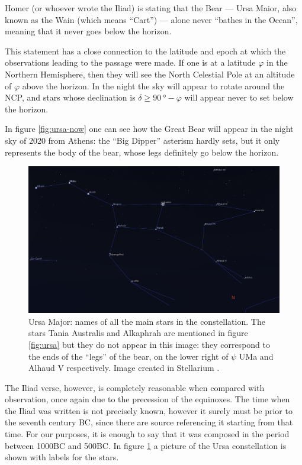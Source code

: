 \documentclass[main.tex]{subfiles}
\begin{document}
Homer (or whoever wrote the Iliad) is stating that the Bear --- Ursa Maior, also known as the Wain (which means ``Cart'') --- alone never ``bathes in the Ocean'', meaning that it never goes below the horizon. 

This statement has a close connection to the latitude and epoch at which the observations leading to the passage were made. 
If one is at a latitude \(\varphi \) in the Northern Hemisphere, then they will see the North Celestial Pole at an altitude of \(\varphi \) above the horizon. In the night the sky will appear to rotate around the NCP, and stars whose declination is \(\delta \geq \SI{90}{\degree} - \varphi \) will appear never to set below the horizon. 

In figure \ref{fig:ursa-now} one can see how the Great Bear will appear in the night sky of 2020 from Athens: the ``Big Dipper'' asterism hardly sets, but it only represents the body of the bear, whose legs definitely go below the horizon. 

\begin{figure}[ht]
\centering
\includegraphics[width=\textwidth]{figures/ursa_names.png}
\caption{Ursa Major: names of all the main stars in the constellation. The stars Tania Australis and Alkaphrah are mentioned in figure \ref{fig:ursa} but they do not appear in this image: they correspond to the ends of the ``legs'' of the bear, on the lower right of \(\psi \) UMa and Alhaud V respectively. Image created in Stellarium \cite[]{stellariumcontributorsStellariumAstronomySoftware2020}.}
\label{fig:ursa-names}
\end{figure}

The Iliad verse, however, is completely reasonable when compared with observation, once again due to the precession of the equinoxes. 
The time when the Iliad was written is not precisely known, however it surely must be prior to the seventh century BC, since there are source referencing it starting from that time.
For our purposes, it is enough to say that it was composed in the period between 1000BC and 500BC.
In figure \ref{fig:ursa-names} a picture of the Ursa constellation is shown with labels for the stars.
\end{document}
